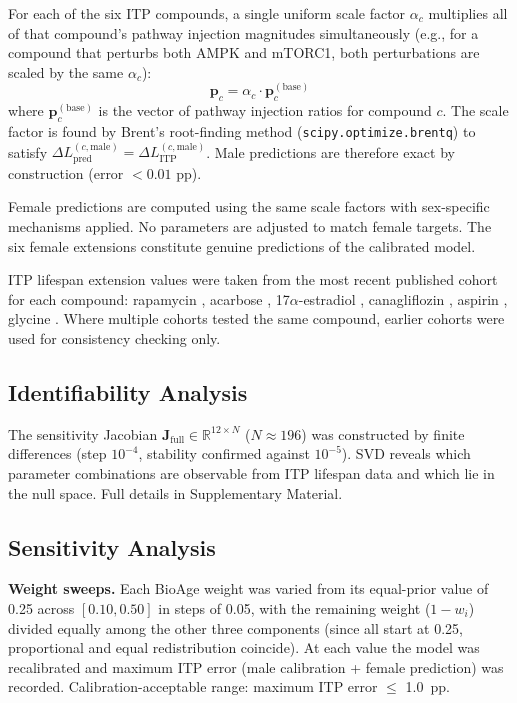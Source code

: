 \documentclass[11pt]{article}
\begin{document}
For each of the six ITP compounds, a single uniform scale factor $\alpha_c$ multiplies all of that compound's pathway injection magnitudes simultaneously (e.g., for a compound that perturbs both AMPK and mTORC1, both perturbations are scaled by the same $\alpha_c$):
\begin{equation}
\mathbf{p}_c = \alpha_c \cdot \mathbf{p}_c^{(\text{base})}
\end{equation}
where $\mathbf{p}_c^{(\text{base})}$ is the vector of pathway injection ratios for compound $c$. The scale factor is found by Brent's root-finding method (\texttt{scipy.optimize.brentq}) to satisfy $\Delta L_{\text{pred}}^{(c, \text{male})} = \Delta L_{\text{ITP}}^{(c, \text{male})}$. Male predictions are therefore exact by construction (error $< 0.01$ pp).

Female predictions are computed using the same scale factors with sex-specific mechanisms applied. No parameters are adjusted to match female targets. The six female extensions constitute genuine predictions of the calibrated model.

ITP lifespan extension values were taken from the most recent published cohort for each compound: rapamycin \citep{Harrison2009,Strong2022}, acarbose \citep{Harrison2014}, 17$\alpha$-estradiol \citep{Garratt2018}, canagliflozin \citep{Miller2020}, aspirin \citep{Strong2016}, glycine \citep{Miller2019glycine}. Where multiple cohorts tested the same compound, earlier cohorts were used for consistency checking only.

\subsection{Identifiability Analysis}
\label{sec:identifiability}

The sensitivity Jacobian $\mathbf{J}_{\text{full}} \in \mathbb{R}^{12 \times N}$ ($N \approx 196$) was constructed by finite differences (step $10^{-4}$, stability confirmed against $10^{-5}$). SVD reveals which parameter combinations are observable from ITP lifespan data and which lie in the null space. Full details in Supplementary Material.

\subsection{Sensitivity Analysis}

\textbf{Weight sweeps.} Each BioAge weight was varied from its equal-prior value of 0.25 across $[0.10, 0.50]$ in steps of 0.05, with the remaining weight ($1 - w_i$) divided equally among the other three components (since all start at 0.25, proportional and equal redistribution coincide). At each value the model was recalibrated and maximum ITP error (male calibration + female prediction) was recorded. Calibration-acceptable range: maximum ITP error $\leq$ 1.0~pp.
\end{document}
